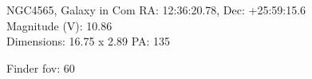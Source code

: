 \begin{block}{NGC4565, Galaxy in Com}
    RA: 12:36:20.78, Dec: +25:59:15.6 \\ 
    Magnitude (V): 10.86 \\ 
    Dimensions: 16.75 x 2.89 PA: 135 

    Finder fov: 60 
\end{block}